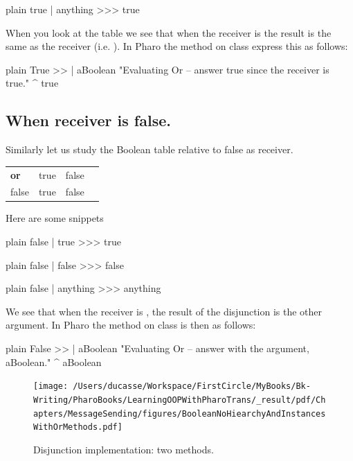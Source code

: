 \documentclass[10pt,twoside,english]{_support/latex/sbabook/sbabook}
\begin{document}
\begin{displaycode}{plain}
true | anything 
>>> true
\end{displaycode}

When you look at the table we see that when the receiver is  the result is the same as the receiver (i.e. ). In Pharo the method \textcode{\textbar{}} on class  express this as follows: 

\begin{displaycode}{plain}
True >> | aBoolean
   "Evaluating Or -- answer true since the receiver is true."
   ^ true
\end{displaycode}
\subsection{When receiver is false.}
Similarly let us study the Boolean table relative to false as receiver. 

\begin{tabular}{llll}
\toprule
\textbf{or} & true & false &  \\
false & true & false &  \\
\bottomrule
\end{tabular}

Here are some snippets

\begin{displaycode}{plain}
false | true 
>>> true
\end{displaycode}

\begin{displaycode}{plain}
false | false 
>>> false
\end{displaycode}

\begin{displaycode}{plain}
false | anything 
>>> anything
\end{displaycode}

We see that when the receiver is , the result of the disjunction is the other argument. In Pharo the method \textcode{\textbar{}} on class  is then as follows: 

\begin{displaycode}{plain}
False >> | aBoolean
   "Evaluating Or -- answer with the argument, aBoolean."
   ^ aBoolean
\end{displaycode}


\begin{figure}

\begin{center}
\texttt{[image: /Users/ducasse/Workspace/FirstCircle/MyBooks/Bk-Writing/PharoBooks/LearningOOPWithPharoTrans/\_result/pdf/Chapters/MessageSending/figures/BooleanNoHiearchyAndInstancesWithOrMethods.pdf]}\caption{Disjunction implementation: two methods.\label{/Users/ducasse/Workspace/FirstCircle/MyBooks/Bk-Writing/PharoBooks/LearningOOPWithPharoTrans/_result/pdf/Chapters/MessageSending/figures/BooleanNoHiearchyAndInstancesWithOrMethods.pdf}}\end{center}
\end{figure}
\end{document}
